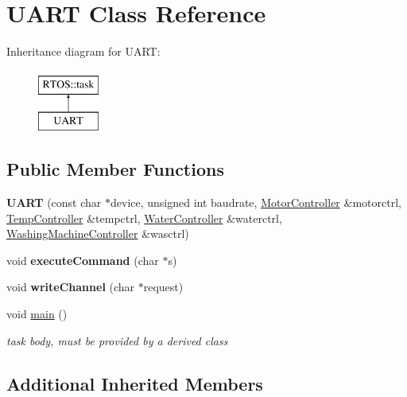 \hypertarget{class_u_a_r_t}{}\section{U\+A\+RT Class Reference}
\label{class_u_a_r_t}
Inheritance diagram for U\+A\+RT\+:\begin{figure}[H]
\begin{center}
\leavevmode
\includegraphics[height=2.000000cm]{class_u_a_r_t}
\end{center}
\end{figure}
\subsection*{Public Member Functions}
\begin{DoxyCompactItemize}
\item 
{\bfseries U\+A\+RT} (const char $\ast$device, unsigned int baudrate, \hyperlink{class_motor_controller}{Motor\+Controller} \&motorctrl, \hyperlink{class_temp_controller}{Temp\+Controller} \&tempctrl, \hyperlink{class_water_controller}{Water\+Controller} \&waterctrl, \hyperlink{class_washing_machine_controller}{Washing\+Machine\+Controller} \&wasctrl)\hypertarget{class_u_a_r_t_abb01b324db3ccf544465d9ade7f9a190}{}\label{class_u_a_r_t_abb01b324db3ccf544465d9ade7f9a190}

\item 
void {\bfseries execute\+Command} (char $\ast$s)\hypertarget{class_u_a_r_t_ae8c21c98efeda377a0c881e312f920ca}{}\label{class_u_a_r_t_ae8c21c98efeda377a0c881e312f920ca}

\item 
void {\bfseries write\+Channel} (char $\ast$request)\hypertarget{class_u_a_r_t_aa5eb2b1507904d52e63b808621db32ea}{}\label{class_u_a_r_t_aa5eb2b1507904d52e63b808621db32ea}

\item 
void \hyperlink{class_u_a_r_t_a1152951cf37d51a378dc1bb25d36a37d}{main} ()
\begin{DoxyCompactList}\small\item\em task body, must be provided by a derived class \end{DoxyCompactList}\end{DoxyCompactItemize}
\subsection*{Additional Inherited Members}


